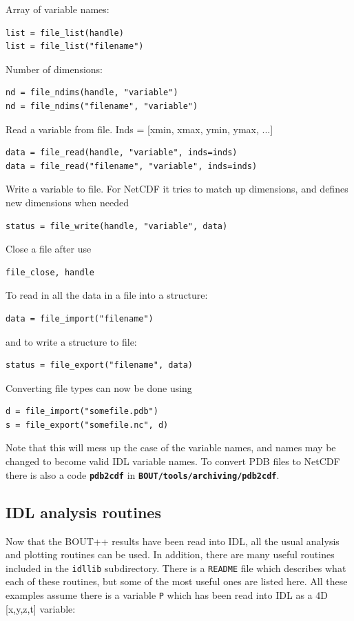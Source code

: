 \documentclass[12pt]{article}
\newcommand{\code}[1]{\texttt{#1}}
\newcommand{\file}[1]{\texttt{\bf #1}}
\begin{document}
Array of variable names:
\begin{verbatim}
list = file_list(handle)
list = file_list("filename")
\end{verbatim}

Number of dimensions:
\begin{verbatim}
nd = file_ndims(handle, "variable")
nd = file_ndims("filename", "variable")
\end{verbatim}

Read a variable from file. Inds = [xmin, xmax, ymin, ymax, ...]
\begin{verbatim}
data = file_read(handle, "variable", inds=inds)
data = file_read("filename", "variable", inds=inds)
\end{verbatim}

Write a variable to file. For NetCDF it tries to match up
dimensions, and defines new dimensions when needed
\begin{verbatim}
status = file_write(handle, "variable", data)
\end{verbatim}

Close a file after use
\begin{verbatim}
file_close, handle
\end{verbatim}

To read in all the data in a file into a structure:
\begin{verbatim}
data = file_import("filename")
\end{verbatim}

and to write a structure to file:
\begin{verbatim}
status = file_export("filename", data)
\end{verbatim}

Converting file types can now be done using
\begin{verbatim}
d = file_import("somefile.pdb")
s = file_export("somefile.nc", d)
\end{verbatim}

Note that this will mess up the case of the variable names,
and names may be changed to become valid IDL variable names.
To convert PDB files to NetCDF there is also a code \file{pdb2cdf} in \file{BOUT/tools/archiving/pdb2cdf}.

\subsection{IDL analysis routines}

Now that the BOUT++ results have been read into IDL, all the usual analysis
and plotting routines can be used. In addition, there are many useful routines
included in the \texttt{idllib} subdirectory. There is a \texttt{README}
file which describes what each of these routines, but some of the most useful
ones are listed here. All these examples assume there is a variable \code{P}
which has been read into IDL as a 4D [x,y,z,t] variable:
\end{document}
